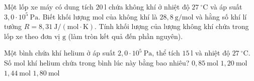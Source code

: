 \begin{ex}
	Một lốp xe máy có dung tích $20\ \mathrm{l}$ chứa không khí ở nhiệt độ $27\ ^\circ\mathrm{C}$ và áp suất $3,0 \cdot 10^5\ \mathrm{Pa}$. Biết khối lượng mol của không khí là $28,8\ \mathrm{g/mol}$ và hằng số khí lí tưởng $R = 8,31\ \mathrm{J/(mol\cdot K)}$. Tính khối lượng của lượng không khí chứa trong lốp xe theo đơn vị $\mathrm{g}$ (làm tròn kết quả đến phần nguyên).
\end{ex}

\begin{ex}
Một bình chứa khí helium ở áp suất $2,0 \cdot 10^5\ \mathrm{Pa}$, thể tích $15\ \mathrm{l}$ và nhiệt độ $27\ ^\circ\mathrm{C}$. Số mol khí helium chứa trong bình lúc này bằng bao nhiêu?
\choice
{$0,85\ \mathrm{mol}$}
{\True $1,20\ \mathrm{mol}$}
{$1,44\ \mathrm{mol}$}
{$1,80\ \mathrm{mol}$}
\end{ex}

